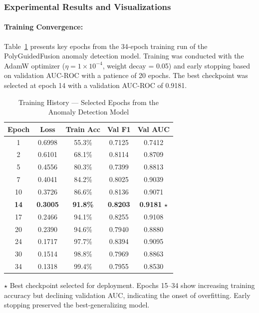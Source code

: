 \documentclass[12pt]{article}
\begin{document}
\subsubsection{Experimental Results and Visualizations}

\paragraph{Training Convergence:}
Table~\ref{tab:training_history} presents key epochs from the 34-epoch training run of the PolyGuidedFusion anomaly detection model. Training was conducted with the AdamW optimizer ($\eta = 1 \times 10^{-4}$, weight decay = 0.05) and early stopping based on validation AUC-ROC with a patience of 20 epochs. The best checkpoint was selected at epoch 14 with a validation AUC-ROC of 0.9181.

\begin{table}[H]
    \centering
    \caption{Training History — Selected Epochs from the Anomaly Detection Model}
    \label{tab:training_history}
    \small
    \begin{tabular}{ccccc}
        \toprule
        \textbf{Epoch} & \textbf{Loss} & \textbf{Train Acc} & \textbf{Val F1} & \textbf{Val AUC} \\
        \midrule
        1  & 0.6998 & 55.3\% & 0.7125 & 0.7412 \\
        2  & 0.6101 & 68.1\% & 0.8114 & 0.8709 \\
        5  & 0.4556 & 80.3\% & 0.7399 & 0.8813 \\
        7  & 0.4041 & 84.2\% & 0.8025 & 0.9039 \\
        10 & 0.3726 & 86.6\% & 0.8136 & 0.9071 \\
        \textbf{14} & \textbf{0.3005} & \textbf{91.8\%} & \textbf{0.8203} & \textbf{0.9181} $\star$ \\
        17 & 0.2466 & 94.1\% & 0.8255 & 0.9108 \\
        20 & 0.2390 & 94.6\% & 0.7940 & 0.8880 \\
        24 & 0.1717 & 97.7\% & 0.8394 & 0.9095 \\
        30 & 0.1514 & 98.8\% & 0.7969 & 0.8863 \\
        34 & 0.1318 & 99.4\% & 0.7955 & 0.8530 \\
        \bottomrule
    \end{tabular}
    
    \vspace{4pt}
    {\footnotesize $\star$ Best checkpoint selected for deployment. Epochs 15--34 show increasing training accuracy but declining validation AUC, indicating the onset of overfitting. Early stopping preserved the best-generalizing model.}
\end{table}
\end{document}
